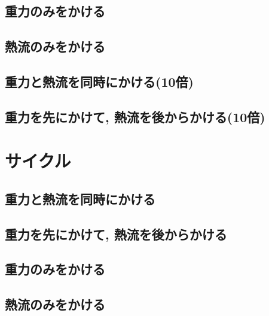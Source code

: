 

\subsection{重力のみをかける}



\subsection{熱流のみをかける}



\subsection{重力と熱流を同時にかける(10倍)}



\subsection{重力を先にかけて, 熱流を後からかける(10倍)}




\section{サイクル}

\subsection{重力と熱流を同時にかける}



\subsection{重力を先にかけて, 熱流を後からかける}



\subsection{重力のみをかける}



\subsection{熱流のみをかける}

